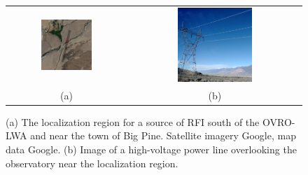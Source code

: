 \begin{bibunit}
\begin{figure}
    \centering
    \begin{tabular}{cc}
        \includegraphics[width=0.45\textwidth]{figures/chapter2/google-maps-rfi-localization} &
        \includegraphics[width=0.45\textwidth]{figures/chapter2/power-line-picture} \\
        (a) & (b) \\
    \end{tabular}
    \caption{
        (a) The localization region for a source of RFI south of the OVRO-LWA and near the town of
        Big Pine. Satellite imagery  Google, map data  Google.
        (b) Image of a high-voltage power line overlooking the observatory near the localization
        region.
    }
    \label{fig:rfi-localization}
\end{figure}

\end{bibunit}

